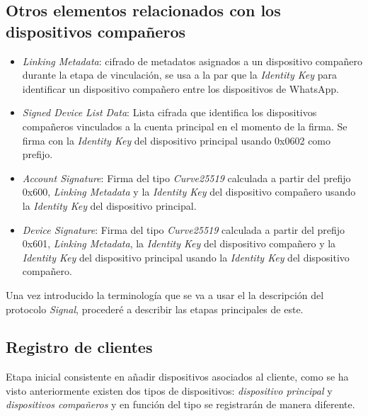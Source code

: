 \subsection{Otros elementos relacionados con los dispositivos compañeros}
\begin{itemize}
	\item \emph{Linking Metadata}: cifrado de metadatos asignados a un dispositivo compañero durante la etapa de vinculación, se usa a la par que la \emph{Identity Key} para identificar un dispositivo compañero entre los dispositivos de WhatsApp.
	\item \emph{Signed Device List Data}: Lista cifrada que identifica los dispositivos compañeros vinculados a la cuenta principal en el momento de la firma. Se firma con la \emph{Identity Key} del dispositivo principal usando 0x0602 como prefijo.
	\item \emph{Account Signature}: Firma del tipo \emph{Curve25519} calculada a partir del prefijo 0x600, \emph{Linking Metadata} y la \emph{Identity Key} del dispositivo compañero usando la \emph{Identity Key} del dispositivo principal.
	\item \emph{Device Signature}: Firma del tipo \emph{Curve25519} calculada a partir del prefijo 0x601, \emph{Linking Metadata}, la \emph{Identity Key} del dispositivo compañero y la \emph{Identity Key} del dispositivo principal usando la \emph{Identity Key} del dispositivo compañero. 
\end{itemize}

Una vez introducido la terminología que se va a usar el la descripción del protocolo \emph{Signal}, procederé a describir las etapas principales de este.\\

\subsection{Registro de clientes}
Etapa inicial consistente en añadir dispositivos asociados al cliente, como se ha visto anteriormente existen dos tipos de dispositivos: \emph{dispositivo principal} y \emph{dispositivos compañeros} y en función del tipo se registrarán de manera diferente.\\

